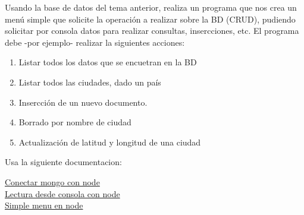\documentclass[4paper]{article}
\begin{document}
Usando la base de datos del tema anterior, realiza un programa que nos crea un menú simple que solicite la operación a realizar sobre la BD (CRUD), pudiendo solicitar por consola datos para realizar consultas, insercciones, etc. El programa debe -por ejemplo- realizar la siguientes acciones:
\begin{enumerate}
\item Listar todos los datos  que se encuetran en la BD
\item Listar todos las ciudades, dado un país
\item Insercción de un nuevo documento.
\item Borrado por nombre de ciudad
\item Actualización de latitud y longitud de una ciudad
\end{enumerate}

Usa la siguiente documentacion:\\
\begin{center}
\href{https://mongodb.github.io/node-mongodb-native/}{Conectar mongo con node}\\
\href{https://teamtreehouse.com/community/how-to-get-input-in-the-console-in-nodejs}{Lectura desde consola con node}\\
\href{https://www.npmjs.com/package/simple-menu}{Simple menu en node}
\end{center}
\end{document}
